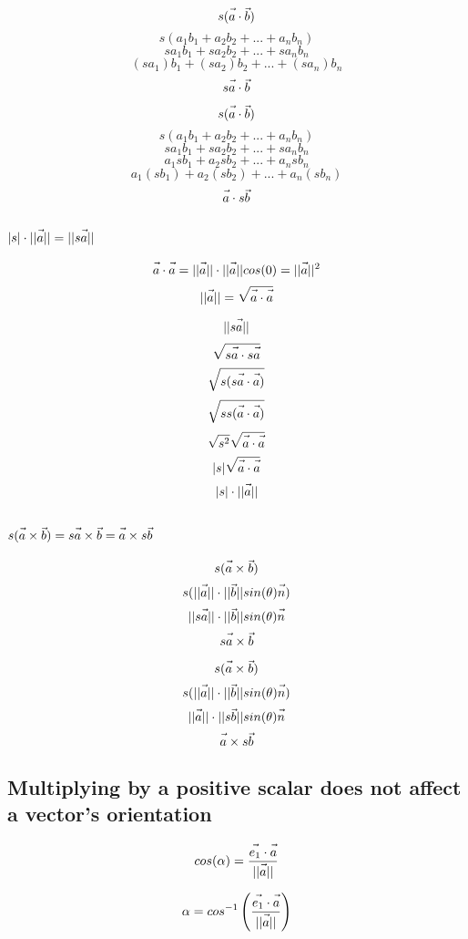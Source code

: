 \documentclass{article}
\newcommand{\fvec}[1]{\vec{\vphantom{A}#1}}
\begin{document}
\noindent\begin{minipage}{.5\linewidth}
$$ s(\fvec{a} \cdot \fvec{b}) $$
$$ s(a_1 b_1 + a_2 b_2 + ... + a_n b_n) $$
$$ s a_1 b_1 + s a_2 b_2 + ... + s a_n b_n $$
$$ (s a_1) b_1 + (s a_2) b_2 + ... + (s a_n) b_n $$
$$ s\fvec{a} \cdot \fvec{b} $$
\end{minipage}%
\hfill
\begin{minipage}{.5\linewidth}
$$ s(\fvec{a} \cdot \fvec{b}) $$
$$ s(a_1 b_1 + a_2 b_2 + ... + a_n b_n) $$
$$ s a_1 b_1 + s a_2 b_2 + ... + s a_n b_n $$
$$ a_1 s b_1 + a_2 s b_2 + ... + a_n s b_n $$
$$ a_1 (s b_1) + a_2 (s b_2) + ... + a_n (s b_n) $$
$$ \fvec{a} \cdot s\fvec{b} $$
\end{minipage}%

\subsection{$ |s| \cdot ||\fvec{a}|| = ||s\fvec{a}|| $}
$$ \fvec{a} \cdot \fvec{a} = ||\fvec{a}|| \cdot ||\fvec{a}|| cos(0) = ||\fvec{a}||^2 $$
$$ ||\fvec{a}|| = \sqrt{\fvec{a} \cdot \fvec{a}} $$

$$ ||s\fvec{a}|| $$
$$ \sqrt{s\fvec{a} \cdot s\fvec{a}} $$
$$ \sqrt{s(s\fvec{a} \cdot \fvec{a})} $$
$$ \sqrt{ss(\fvec{a} \cdot \fvec{a})} $$
$$ \sqrt{s^2}\sqrt{\fvec{a} \cdot \fvec{a}} $$
$$ |s|\sqrt{\fvec{a} \cdot \fvec{a}} $$
$$ |s| \cdot ||\fvec{a}|| $$

\subsection{$ s(\fvec{a} \times \fvec{b}) = s\fvec{a} \times \fvec{b} = \fvec{a} \times s\fvec{b} $}
\noindent\begin{minipage}{.5\linewidth}
$$ s(\fvec{a} \times \fvec{b}) $$
$$ s(||\fvec{a}|| \cdot ||\fvec{b}|| sin(\theta) \fvec{n}) $$
$$ ||s\fvec{a}|| \cdot ||\fvec{b}|| sin(\theta) \fvec{n} $$
$$ s\fvec{a} \times \fvec{b} $$
\end{minipage}%
\hfill
\begin{minipage}{.5\linewidth}
$$ s(\fvec{a} \times \fvec{b}) $$
$$ s(||\fvec{a}|| \cdot ||\fvec{b}|| sin(\theta) \fvec{n}) $$
$$ ||\fvec{a}|| \cdot ||s\fvec{b}|| sin(\theta) \fvec{n} $$
$$ \fvec{a} \times s\fvec{b} $$
\end{minipage}%

\subsection{Multiplying by a positive scalar does not affect a vector's orientation}
\noindent\begin{minipage}{.5\linewidth}
$$ cos(\alpha) = \frac{\fvec{e_1} \cdot \fvec{a}}{||\fvec{a}||} $$
\end{minipage}%
\hfill
\begin{minipage}{.5\linewidth}
$$ \alpha = cos^{-1}\left(\frac{\fvec{e_1} \cdot \fvec{a}}{||\fvec{a}||}\right) $$
\end{minipage}%
\end{document}
